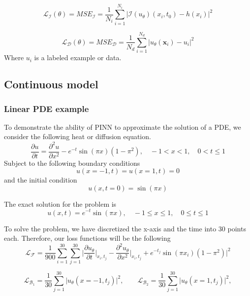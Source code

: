 \documentclass[a4paper,12pt]{article}
\theoremstyle{definition}
\begin{document}
\begin{equation}
\mathcal{L}_{\mathcal{I}}(\theta) = MSE_{\mathcal{I}} 
= \frac{1}{N_i} \sum_{i=1}^{N_i} \bigg| \mathcal{I}(u_\theta)(x_i, t_0) - h(x_i) \bigg|^2
\end{equation}

\begin{equation}
\mathcal{L}_{\mathcal{D}}(\theta) = MSE_{\mathcal{D}} 
= \frac{1}{N_d} \sum_{i=1}^{N_d} \bigg| u_{\theta}(\mathbf{x}_i) - u_i \bigg|^2
\end{equation}
Where $u_i$ is a labeled example or data.

\subsection{Continuous model}
\subsubsection{Linear PDE example}
To demonstrate the ability of PINN to approximate the solution of a PDE, we 
consider the following heat or diffusion equation.
\begin{equation}
\frac{\partial u}{\partial t} = \frac{\partial^2 u}{\partial x^2}
- e^{-t} \sin{(\pi x)} (1 - \pi^2), \quad -1 < x < 1, \quad 0 < t \le 1
\end{equation} 
Subject to the following boundary conditions
\begin{equation}
    u(x=-1, t) = u(x=1, t) = 0
\end{equation}
and the initial condition
\begin{equation}
u(x, t=0) = \sin(\pi x)
\end{equation}

The exact solution for the problem is 
\begin{equation}
u(x, t) = e^{-t} \sin(\pi x), \quad -1 \le x \le 1, \quad 0 \le t \le 1
\end{equation}

To solve the problem, we have discretized the x-axis and the time into $30$ points each.
Therefore, our loss functions will be the following
$$
\mathcal{L}_{\mathcal{F}} = \frac{1}{900} \sum_{i=1}^{30} \sum_{j=1}^{30} 
\Bigg| 
\frac{\partial u_\theta}{\partial t}\bigg|_{x_i, t_j} - \frac{\partial^2 u_\theta}{\partial x^2}\bigg|_{x_i, t_j}
+ e^{-t_j} \sin{(\pi x_i)} (1 - \pi^2) 
\Bigg|^2
$$

$$
\mathcal{L}_{\mathcal{B}_1} = \frac{1}{30} \sum_{j=1}^{30} 
\Bigg| u_\theta(x=-1, t_j) \Bigg|^2, \qquad
\mathcal{L}_{\mathcal{B}_2} = \frac{1}{30} \sum_{j=1}^{30} 
\Bigg| u_\theta(x=1, t_j) \Bigg|^2,
$$
\end{document}
